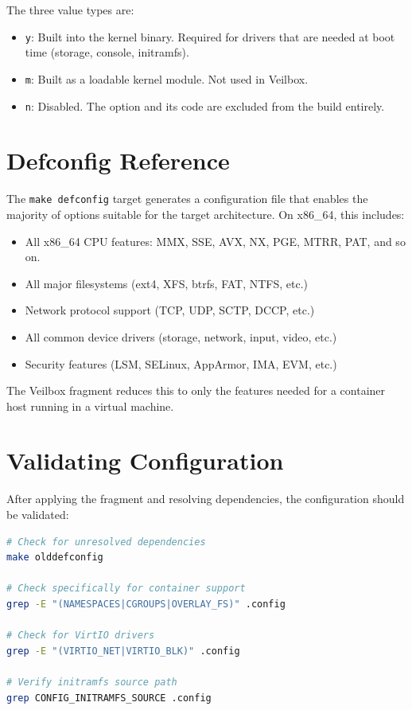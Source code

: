 The three value types are:
\begin{itemize}[nosep]
  \item \texttt{y}: Built into the kernel binary. Required for drivers
        that are needed at boot time (storage, console, initramfs).
  \item \texttt{m}: Built as a loadable kernel module. Not used in
        Veilbox.
  \item \texttt{n}: Disabled. The option and its code are excluded from
        the build entirely.
\end{itemize}

\section{Defconfig Reference}

The \texttt{make defconfig} target generates a configuration file that
enables the majority of options suitable for the target architecture.
On x86\_64, this includes:

\begin{itemize}[nosep]
  \item All x86\_64 CPU features: MMX, SSE, AVX, NX, PGE, MTRR, PAT,
        and so on.
  \item All major filesystems (ext4, XFS, btrfs, FAT, NTFS, etc.)
  \item Network protocol support (TCP, UDP, SCTP, DCCP, etc.)
  \item All common device drivers (storage, network, input, video, etc.)
  \item Security features (LSM, SELinux, AppArmor, IMA, EVM, etc.)
\end{itemize}

The Veilbox fragment reduces this to only the features needed for a
container host running in a virtual machine.

\section{Validating Configuration}

After applying the fragment and resolving dependencies, the configuration
should be validated:

\begin{lstlisting}[language=bash]
# Check for unresolved dependencies
make olddefconfig

# Check specifically for container support
grep -E "(NAMESPACES|CGROUPS|OVERLAY_FS)" .config

# Check for VirtIO drivers
grep -E "(VIRTIO_NET|VIRTIO_BLK)" .config

# Verify initramfs source path
grep CONFIG_INITRAMFS_SOURCE .config
\end{lstlisting}


